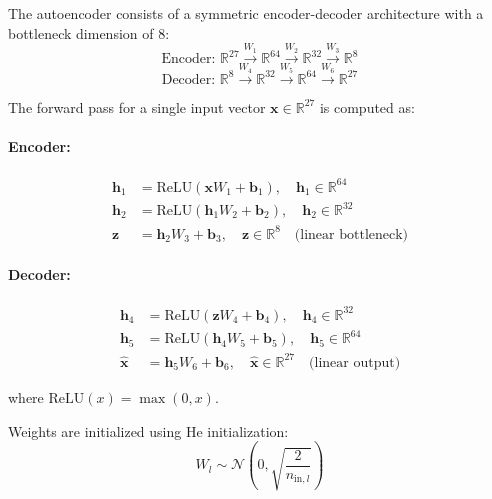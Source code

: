 \documentclass[preprint,12pt]{elsarticle}
\begin{document}
The autoencoder consists of a symmetric encoder-decoder architecture with a bottleneck dimension of 8:
%
\begin{equation}
    \text{Encoder: } \mathbb{R}^{27} \xrightarrow{W_1} \mathbb{R}^{64} \xrightarrow{W_2} \mathbb{R}^{32} \xrightarrow{W_3} \mathbb{R}^{8}
\end{equation}
%
\begin{equation}
    \text{Decoder: } \mathbb{R}^{8} \xrightarrow{W_4} \mathbb{R}^{32} \xrightarrow{W_5} \mathbb{R}^{64} \xrightarrow{W_6} \mathbb{R}^{27}
\end{equation}

The forward pass for a single input vector $\mathbf{x} \in \mathbb{R}^{27}$ is computed as:

\paragraph{Encoder:}
\begin{align}
    \mathbf{h}_1 &= \mathrm{ReLU}(\mathbf{x} W_1 + \mathbf{b}_1), \quad \mathbf{h}_1 \in \mathbb{R}^{64} \\
    \mathbf{h}_2 &= \mathrm{ReLU}(\mathbf{h}_1 W_2 + \mathbf{b}_2), \quad \mathbf{h}_2 \in \mathbb{R}^{32} \\
    \mathbf{z} &= \mathbf{h}_2 W_3 + \mathbf{b}_3, \quad \mathbf{z} \in \mathbb{R}^{8} \quad \text{(linear bottleneck)}
\end{align}

\paragraph{Decoder:}
\begin{align}
    \mathbf{h}_4 &= \mathrm{ReLU}(\mathbf{z} W_4 + \mathbf{b}_4), \quad \mathbf{h}_4 \in \mathbb{R}^{32} \\
    \mathbf{h}_5 &= \mathrm{ReLU}(\mathbf{h}_4 W_5 + \mathbf{b}_5), \quad \mathbf{h}_5 \in \mathbb{R}^{64} \\
    \hat{\mathbf{x}} &= \mathbf{h}_5 W_6 + \mathbf{b}_6, \quad \hat{\mathbf{x}} \in \mathbb{R}^{27} \quad \text{(linear output)}
\end{align}

where $\mathrm{ReLU}(x) = \max(0, x)$.

Weights are initialized using He initialization:
\begin{equation}
    W_l \sim \mathcal{N}\!\left(0, \sqrt{\frac{2}{n_{\mathrm{in},l}}}\right)
\end{equation}
\end{document}

